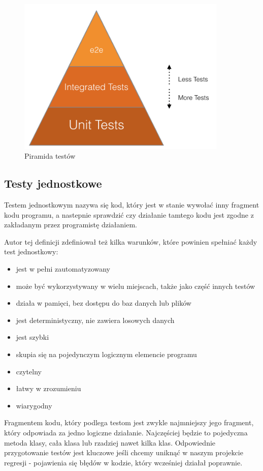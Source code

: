 \begin{figure}[htbp]
    \centering
    \includegraphics[width=10cm]{images/testing_triangle.png}
    \caption{Piramida testów}
    \label{fig:testing}
\end{figure}



\subsection{Testy jednostkowe}
Testem jednostkowym nazywa się kod, który jest w stanie wywołać inny fragment kodu programu, a nastepnie sprawdzić czy działanie tamtego kodu jest zgodne z zakładanym przez programistę działaniem. \cite{UnitDefinition}
\par Autor tej definicji zdefiniował też kilka warunków, które powinien spełniać każdy test jednostkowy: 
\begin{itemize}
    \item jest w pełni zautomatyzowany
    \item może być wykorzystywany w wielu miejscach, także jako część innych testów
    \item działa w pamięci, bez dostępu do baz danych lub plików
    \item jest deterministyczny, nie zawiera losowych danych
    \item jest szybki
    \item skupia się na pojedynczym logicznym elemencie programu
    \item czytelny
    \item łatwy w zrozumieniu
    \item wiarygodny 
\end{itemize}
Fragmentem kodu, który podlega testom jest zwykle najmniejszy jego fragment, który odpowiada za jedno logiczne działanie. Najczęściej będzie to pojedyczna metoda klasy, cała klasa lub rzadziej nawet kilka klas. Odpowiednie przygotowanie testów jest kluczowe jeśli chcemy uniknąć w naszym projekcie regresji - pojawienia się błędów w kodzie, który wcześniej działał poprawnie. 

